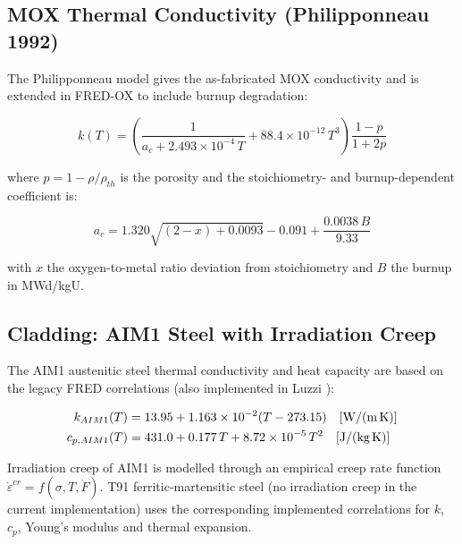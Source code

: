 \begin{refsection}
\subsection{MOX Thermal Conductivity (Philipponneau 1992)}
\label{sec:mox_k}

The Philipponneau model \cite{philipponneau1992} gives the as-fabricated MOX conductivity and is extended in FRED-OX to include burnup degradation:

\begin{equation}
  k(T) = \left(\frac{1}{a_c + 2.493\times10^{-4}\,T}
               + 88.4\times10^{-12}\,T^3\right)
         \frac{1 - p}{1 + 2p}
  \label{eq:k_mox}
\end{equation}

where $p = 1 - \rho/\rho_{th}$ is the porosity and the stoichiometry- and burnup-dependent coefficient is:

\begin{equation}
  a_c = 1.320\sqrt{(2 - x) + 0.0093} - 0.091
        + \frac{0.0038\,B}{9.33}
  \label{eq:ac_burnup}
\end{equation}

with $x$ the oxygen-to-metal ratio deviation from stoichiometry and $B$ the burnup in MWd/kgU.

\subsection{Cladding: AIM1 Steel with Irradiation Creep}
\label{sec:aim1}

The AIM1 austenitic steel thermal conductivity and heat capacity are based on the legacy FRED correlations (also implemented in Luzzi \cite{luzzi2004}):

\begin{align}
  k_{AIM1}(T) &= 13.95 + 1.163\times10^{-2}(T - 273.15) \quad \text{[W/(m\,K)]} \\
  c_{p,AIM1}(T) &= 431.0 + 0.177\,T + 8.72\times10^{-5}\,T^2 \quad \text{[J/(kg\,K)]}
\end{align}

Irradiation creep of AIM1 is modelled through an empirical creep rate function $\dot{\varepsilon}^{cr} = f(\sigma, T, \dot{F})$.  T91 ferritic-martensitic steel (no irradiation creep in the current implementation) uses the corresponding implemented correlations for $k$, $c_p$, Young's modulus and thermal expansion.

\printbibliography[heading=subbibliography,title={References}]
\end{refsection}
